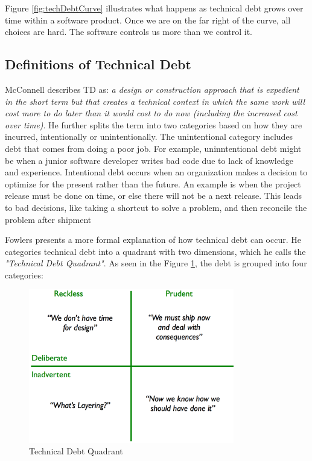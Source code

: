 Figure \ref{fig:techDebtCurve} illustrates what happens as technical debt grows over time within a software product. Once we are on the far right of the curve, all choices are hard. The software controls us more than we control it.


\subsection{Definitions of Technical Debt}
McConnell describes TD as: \textit{a design or construction approach that is expedient in the short term but that creates a technical context in which the same work will cost more to do later than it would cost to do now (including the increased cost over time)}. He further splits the term into two categories based on how they are incurred, intentionally or unintentionally\cite{url-mcconnell}. The unintentional category includes debt that comes from doing a poor job. For example, uninntentional debt might be when a junior software developer writes bad code due to lack of knowledge and experience. Intentional debt occurs when an organization makes a decision to optimize for the present rather than the future. An example is when the project release must be done on time, or else there will not be a next release. This leads to bad decisions, like taking a shortcut to solve a problem, and then reconcile the problem after shipment

Fowlers presents a more formal explanation of how technical debt can occur\cite{url-fowler}. He categories technical debt into a quadrant with two dimensions, which he calls the \textit{"Technical Debt Quadrant"}. As seen in the Figure \ref{fig:techDebtQuad}, the debt is grouped into four categories: 

\begin{figure}[ht!]
	\centering
	\includegraphics[width=0.8\textwidth]{images/techDebtQuadrant.png}
	\caption{Technical Debt Quadrant}
	\label{fig:techDebtQuad}
\end{figure}

